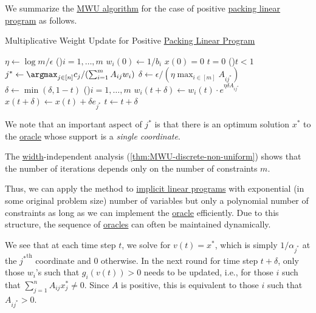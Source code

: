 We summarize the \hyperref[algo:MWU-discrete-non-uniform]{MWU algorithm} for the case of positive \hyperref[def:packing-LP]{packing linear program} as follows.

\begin{algorithm}[H]\label{algo:MWU-discrete-linear}
	\DontPrintSemicolon{}
	\caption{Multiplicative Weight Update for Positive \hyperref[def:packing-LP]{Packing Linear Program}}
	\BlankLine

	\(\eta \gets \log m / \epsilon \)\;
	\;
	\For(){\(i = 1, \dots , m\)}{
		\(w_i(0) \gets 1 / b_i\)\;
	}
	\(x(0) = 0\)
	\(t = 0\)\;
	\;
	\While(){\(t < 1\)}{
		\(j^{\ast} \gets \argmax_{j \in [n]} c_j / (\sum_{i=1}^{m} A_{ij} w_i)\)\;
		\(\delta \gets \epsilon / (\eta \max _{i \in [m]} A_{ij^{\ast} })\)
		\(\delta \gets \min (\delta , 1 - t)\)
		\For(){\(i = 1, \dots , m\)}{
			\(w_i(t+\delta ) \gets w_i(t) \cdot e^{\eta \delta A_{ij^{\ast} }}\)\;
		}
		\(x (t+\delta ) \gets x (t) + \delta e_{j^{\ast} }\)\;
		\(t \gets t + \delta \)\;
	}
	\;
\end{algorithm}

We note that an important aspect of \(j^{\ast} \) is that there is an optimum solution \(x^{\ast} \) to the \hyperref[eq:MWU-oracle-LP]{oracle} whose support is a \emph{single coordinate}.

\begin{prev}
	The \hyperref[def:width]{width}-independent analysis (\autoref{thm:MWU-discrete-non-uniform}) shows that the number of iterations depends only on the number of constraints \(m\).
\end{prev}

Thus, we can apply the method to \hyperref[def:implicit-LP]{implicit linear programs} with exponential (in some original problem size) number of variables but only a polynomial number of constraints as long as we can implement the \hyperref[eq:MWU-oracle-LP]{oracle} efficiently. Due to this structure, the sequence of \hyperref[eq:MWU-oracle-LP]{oracles} can often be maintained dynamically.

\begin{remark}
	We see that at each time step \(t\), we solve for \(v(t) = x^{\ast} \), which is simply \(1 / \alpha _{j^{\ast} }\) at the \({j^{\ast} }^{\text{th} }\) coordinate and \(0\) otherwise. In the next round for time step \(t + \delta \), only those \(w_i\)'s such that \(g_i(v(t)) > 0\) needs to be updated, i.e., for those \(i\) such that \(\sum_{j=1}^{n} A_{ij} x^{\ast} _j \neq 0\). Since \(A\) is positive, this is equivalent to those \(i\) such that \(A_{i j^{\ast} } > 0\).
\end{remark}

